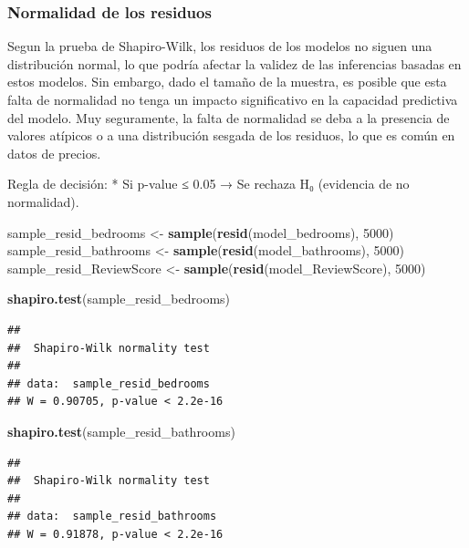 \documentclass[
]{article}
\newenvironment{Shaded}{\begin{snugshade}}{\end{snugshade}}
\newcommand{\DecValTok}[1]{\textcolor[rgb]{0.00,0.00,0.81}{#1}}
\newcommand{\FunctionTok}[1]{\textcolor[rgb]{0.13,0.29,0.53}{\textbf{#1}}}
\newcommand{\NormalTok}[1]{#1}
\newcommand{\OtherTok}[1]{\textcolor[rgb]{0.56,0.35,0.01}{#1}}
\begin{document}
\subsubsection{Normalidad de los
residuos}\label{normalidad-de-los-residuos}

Segun la prueba de Shapiro-Wilk, los residuos de los modelos no siguen
una distribución normal, lo que podría afectar la validez de las
inferencias basadas en estos modelos. Sin embargo, dado el tamaño de la
muestra, es posible que esta falta de normalidad no tenga un impacto
significativo en la capacidad predictiva del modelo. Muy seguramente, la
falta de normalidad se deba a la presencia de valores atípicos o a una
distribución sesgada de los residuos, lo que es común en datos de
precios.

Regla de decisión: * Si p-value ≤ 0.05 → Se rechaza H₀ (evidencia de no
normalidad).

\begin{Shaded}
\begin{Highlighting}[]
\NormalTok{sample\_resid\_bedrooms }\OtherTok{\textless{}{-}} \FunctionTok{sample}\NormalTok{(}\FunctionTok{resid}\NormalTok{(model\_bedrooms), }\DecValTok{5000}\NormalTok{)}
\NormalTok{sample\_resid\_bathrooms }\OtherTok{\textless{}{-}} \FunctionTok{sample}\NormalTok{(}\FunctionTok{resid}\NormalTok{(model\_bathrooms), }\DecValTok{5000}\NormalTok{)}
\NormalTok{sample\_resid\_ReviewScore }\OtherTok{\textless{}{-}} \FunctionTok{sample}\NormalTok{(}\FunctionTok{resid}\NormalTok{(model\_ReviewScore), }\DecValTok{5000}\NormalTok{)}

\FunctionTok{shapiro.test}\NormalTok{(sample\_resid\_bedrooms)}
\end{Highlighting}
\end{Shaded}

\begin{verbatim}
## 
##  Shapiro-Wilk normality test
## 
## data:  sample_resid_bedrooms
## W = 0.90705, p-value < 2.2e-16
\end{verbatim}

\begin{Shaded}
\begin{Highlighting}[]
\FunctionTok{shapiro.test}\NormalTok{(sample\_resid\_bathrooms)}
\end{Highlighting}
\end{Shaded}

\begin{verbatim}
## 
##  Shapiro-Wilk normality test
## 
## data:  sample_resid_bathrooms
## W = 0.91878, p-value < 2.2e-16
\end{verbatim}
\end{document}
